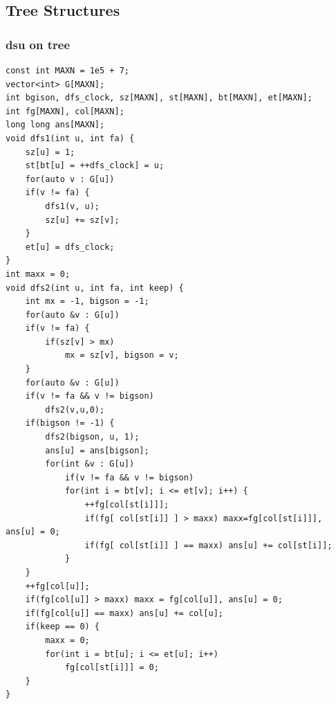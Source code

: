 \documentclass[10pt]{ctexart}
\begin{document}
{\subsection{Tree Structures}
\subsubsection{dsu on tree}
\begin{lstlisting}
const int MAXN = 1e5 + 7;
vector<int> G[MAXN];
int bgison, dfs_clock, sz[MAXN], st[MAXN], bt[MAXN], et[MAXN];
int fg[MAXN], col[MAXN];
long long ans[MAXN];
void dfs1(int u, int fa) {
	sz[u] = 1;
	st[bt[u] = ++dfs_clock] = u;
	for(auto v : G[u]) 
	if(v != fa) {
		dfs1(v, u);
		sz[u] += sz[v];
	}
	et[u] = dfs_clock;
}
int maxx = 0;
void dfs2(int u, int fa, int keep) {
	int mx = -1, bigson = -1;
	for(auto &v : G[u]) 
	if(v != fa) {
		if(sz[v] > mx) 
			mx = sz[v], bigson = v;
	}
	for(auto &v : G[u]) 
	if(v != fa && v != bigson) 
		dfs2(v,u,0);
	if(bigson != -1) {
		dfs2(bigson, u, 1);
		ans[u] = ans[bigson];
		for(int &v : G[u]) 
			if(v != fa && v != bigson)
			for(int i = bt[v]; i <= et[v]; i++) {
				++fg[col[st[i]]];
				if(fg[ col[st[i]] ] > maxx) maxx=fg[col[st[i]]], ans[u] = 0;
				if(fg[ col[st[i]] ] == maxx) ans[u] += col[st[i]];
			}
	}
	++fg[col[u]];
	if(fg[col[u]] > maxx) maxx = fg[col[u]], ans[u] = 0;
	if(fg[col[u]] == maxx) ans[u] += col[u];
	if(keep == 0) {
		maxx = 0;
		for(int i = bt[u]; i <= et[u]; i++)
			fg[col[st[i]]] = 0;
	}
}
\end{lstlisting}
}
\end{document}
